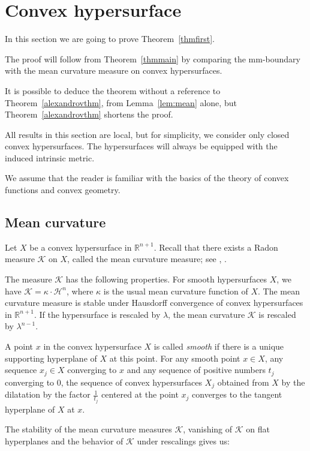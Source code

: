 \documentclass[12pt,leqno,intlimits]{amsart}
\numberwithin{equation}{section}
\theoremstyle{definition}
\theoremstyle{remark}
\newcommand{\tref}[1]{Theorem~\ref{#1}}
\newcommand{\lref}[1]{Lemma~\ref{#1}}
\newcommand{\R}{\mathbb{R}}
\begin{document}
\section{Convex hypersurface} \label{sec:hyper}
In this section we are going to prove \tref{thmfirst}.

The proof will follow from \tref{thmmain} by comparing the mm-boundary with the mean curvature measure on convex hypersurfaces.

It is possible to deduce the theorem without a reference to \tref{alexandrovthm}, from \lref{lem:mean} alone, but \tref{alexandrovthm} shortens the proof.

All results in this section are local,
but for simplicity, we consider only closed convex hypersurfaces.
The hypersurfaces will always be equipped with the induced intrinsic metric.

We assume that the reader is familiar with the basics of the theory of convex functions and convex geometry.

\subsection{Mean curvature}
Let $X$ be a convex hypersurface in $\R^{n+1}$. Recall that there exists a Radon measure $\mathcal K$ on $X$, called the mean curvature measure; see \cite{Schneider}, \cite{Fedcurvature}.

The measure $\mathcal K$ has the following properties.
For smooth hypersurfaces $X$, we have $\mathcal K=\kappa \cdot \mathcal H^n$, where $\kappa$ is the usual mean curvature function of $X$.
The mean curvature measure is stable under Hausdorff convergence of convex hypersurfaces in $\R^{n+1}$.
If the hypersurface is rescaled by $\lambda$, the mean curvature $\mathcal K$ is rescaled by $\lambda^{n-1}$. %

A point $x$ in the convex hypersurface $X$ is called \emph{smooth} if there is a unique supporting hyperplane of $X$ at this point.
For any smooth point $x\in X$, any sequence $x_j\in X$ converging to $x$ and any sequence of positive numbers $t_j$ converging to $0$, the
sequence of convex hypersurfaces $X_j$ obtained from $X$ by the dilatation by the factor $\frac 1 {t_j}$ centered at the point $x_j$ converges
to the tangent hyperplane of $X$ at $x$.

The stability of the mean curvature measures $\mathcal K$, vanishing of $\mathcal K$ on flat hyperplanes and
the behavior of $\mathcal K$ under rescalings gives us:
\end{document}
